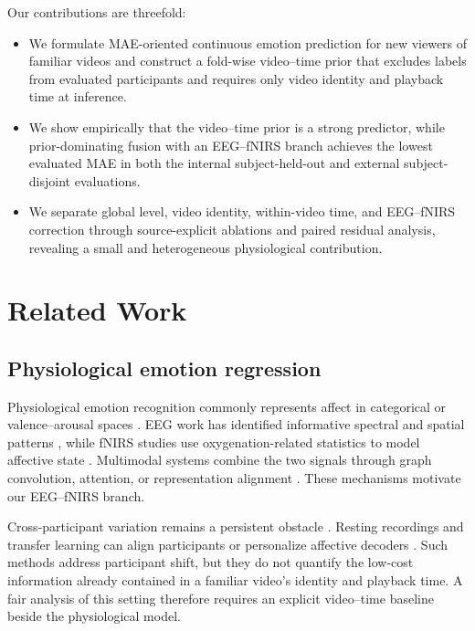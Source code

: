 Our contributions are threefold:

\begin{itemize}
  \item We formulate MAE-oriented continuous emotion prediction for new
  viewers of familiar videos and construct a fold-wise video--time prior that
  excludes labels from evaluated participants and requires only video identity
  and playback time at inference.
  \item We show empirically that the video--time prior is a strong predictor,
  while prior-dominating fusion with an EEG--fNIRS branch achieves the lowest
  evaluated MAE in both the internal subject-held-out and external
  subject-disjoint evaluations.
  \item We separate global level, video identity, within-video time, and
  EEG--fNIRS correction through source-explicit ablations and paired residual
  analysis, revealing a small and heterogeneous physiological contribution.
\end{itemize}

\section{Related Work}
\label{sec:related}

\subsection{Physiological emotion regression}

Physiological emotion recognition commonly represents affect in categorical or
valence--arousal spaces \cite{russell1980circumplex,koelstra2012deap}. EEG work
has identified informative spectral and spatial patterns
\cite{zheng2015critical}, while fNIRS studies use oxygenation-related statistics
to model affective state \cite{bandara2018fnirs}. Multimodal systems combine the
two signals through graph convolution, attention, or representation alignment
\cite{sun2020multimodal,chen2024eegfnirs,fang2026asac}. These mechanisms motivate
our EEG--fNIRS branch.

Cross-participant variation remains a persistent obstacle
\cite{li2022eegreview,li2018crosssubject}. Resting recordings and transfer
learning can align participants or personalize affective decoders
\cite{morioka2015resting,zheng2016personalizing}. Such methods address
participant shift, but they do not quantify the low-cost information already
contained in a familiar video's identity and playback time. A fair analysis of
this setting therefore requires an explicit video--time baseline beside the
physiological model.

